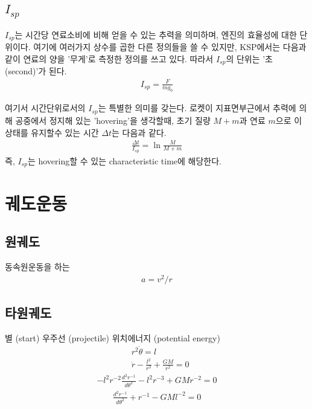 \documentclass[9pt,twoside,openany]{amsbook}
\begin{document}
\section{$I_{sp}$}
$I_{sp}$는 시간당 연료소비에 비해 얻을 수 있는 추력을 의미하며, 엔진의 효율성에 대한 단위이다.
여기에 여러가지 상수를 곱한 다른 정의들을 쓸 수 있지만, KSP에서는 다음과 같이 연료의 양을 '무게'로 측정한 정의를 쓰고 있다. 따라서 $I_{sp}$의 단위는 '초(second)'가 된다.
\begin{align}
I_{sp} = \frac{F}{\dot{m}g_0}
\end{align}

여기서 시간단위로서의 $I_{sp}$는 특별한 의미를 갖는다. 
로켓이 지표면부근에서 추력에 의해 공중에서 정지해 있는 'hovering'을 생각할때, 
초기 질량 $M+m$과 연료 $m$으로 이 상태를 유지할수 있는 시간 $\Delta t$는 다음과 같다.
\begin{align}
\frac{\Delta t}{I_{sp}} = \ln\frac{M}{M+m}
\end{align}
즉, $I_{sp}$는 hovering할 수 있는 characteristic time에 해당한다.


\chapter{궤도운동}
\section{원궤도}
동속원운동을 하는 
\begin{align}
 a = v^2/r
\end{align}

\section{타원궤도}
별 (start) 우주선 (projectile) 위치에너지 (potential energy)
\begin{align}
&r^2 \dot{\theta} = l
\\&\ddot{r}-\frac{l^2}{r^3}+\frac{GM}{r^2} = 0
\end{align}
\begin{align}
	-l^2r^{-2}\frac{d^2r^{-1}}{d\theta^2}-l^2r^{-3}+GMr^{-2} = 0
\end{align}
\begin{align}
	\frac{d^2r^{-1}}{d\theta^2}+r^{-1}-GMl^{-2} = 0
\end{align}
\end{document}
